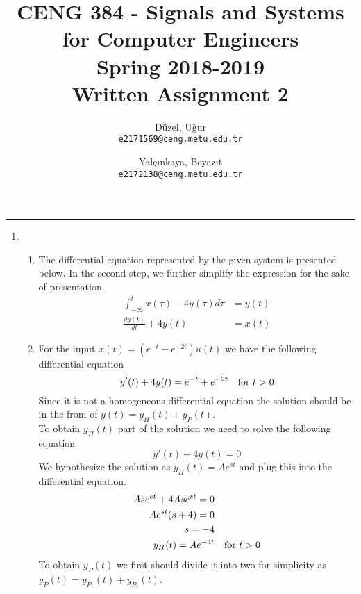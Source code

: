 \documentclass[10pt,a4paper, margin=1in]{article}
\author{
  Düzel, Uğur\\
  \texttt{e2171569@ceng.metu.edu.tr}
  \and
  Yalçınkaya, Beyazıt\\
  \texttt{e2172138@ceng.metu.edu.tr}
}
\title{CENG 384 - Signals and Systems for Computer Engineers \\
Spring 2018-2019 \\
Written Assignment 2}
\begin{document}
\maketitle



\noindent\rule{19cm}{1.2pt}

\begin{enumerate}

\item 
    \begin{enumerate}
    \item The differential equation represented by the given system is presented below. In the second step, we further simplify the expression for the sake of presentation.
    	\begin{equation}
	\begin{split}
		\int_{-\infty}^{t} x(\tau) - 4y(\tau) d \tau & = y(t)\\
		\frac{dy(t)}{dt} + 4y(t) & = x(t)
	\end{split}
	\end{equation}
    \item %
	For the input $x(t)=(e^{-t}+e^{-2t})u(t)$ we have the following differential equation 
	\begin{equation}
	y'(t) + 4y(t) = e^{-t}+e^{-2t} \text{\quad for } t > 0 
	\end{equation}
	Since it is not a homogeneous differential equation the solution should be in the from of $y(t)=y_H(t)+y_P(t)$. \\
	To obtain $y_H(t)$ part of the solution we need to solve the following equation
	\begin{equation}
	 y'(t) + 4y(t) =0
	\end{equation}
	We hypothesize the solution as $y_H(t)=Ae^{st}$ and plug this into the differential equation. \\
    	\begin{equation}
	\begin{split}
		Ase^{st} + 4Ase^{st} = 0 & \\
		Ae^{st} (s + 4) = 0 & \\
		s = -4 & \\
		y_H(t) = Ae^{-4t} &\text{\quad for } t>0 
	\end{split}
	\end{equation}	
	To obtain $y_P(t )$ we first should divide it into two for simplicity as $y_P(t)=y_{P_1}(t)+y_{P_2}(t)$. \\ \\

\end{enumerate}
\end{enumerate}
\end{document}
